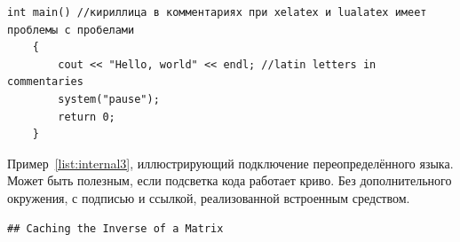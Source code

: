 {\begin{ListingEnv}[H]
\begin{lstlisting}[language={[ISO]C++}]
	int main() //кириллица в комментариях при xelatex и lualatex имеет проблемы с пробелами
	{
		cout << "Hello, world" << endl; //latin letters in commentaries
		system("pause");
		return 0;
	}
    \end{lstlisting}
\end{ListingEnv}%
%        
%        
%
%
%


Пример~\ref{list:internal3}, иллюстрирующий подключение переопределённого языка. Может быть полезным, если подсветка кода работает криво. Без дополнительного окружения, с подписью и ссылкой, реализованной встроенным средством.
\begin{lstlisting}[language={Renhanced},caption={Пример листинга c подписью собственными средствами},label={list:internal3}]
## Caching the Inverse of a Matrix


\end{lstlisting}}
